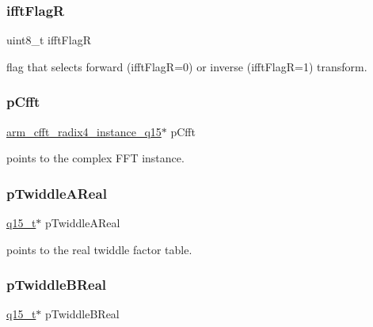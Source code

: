 \subsubsection{\texorpdfstring{ifftFlagR}{ifftFlagR}}
{\footnotesize\ttfamily uint8\+\_\+t ifft\+FlagR}

flag that selects forward (ifft\+FlagR=0) or inverse (ifft\+FlagR=1) transform. \mbox{\label{structarm__rfft__instance__q15_ae0ac7c3a89699793fc0dac960db7f056}} 
\subsubsection{\texorpdfstring{pCfft}{pCfft}}
{\footnotesize\ttfamily \mbox{\hyperlink{structarm__cfft__radix4__instance__q15}{arm\+\_\+cfft\+\_\+radix4\+\_\+instance\+\_\+q15}}$\ast$ p\+Cfft}

points to the complex F\+FT instance. \mbox{\label{structarm__rfft__instance__q15_ac17beaa033ab1ea242d49037276b67e2}} 
\subsubsection{\texorpdfstring{pTwiddleAReal}{pTwiddleAReal}}
{\footnotesize\ttfamily \mbox{\hyperlink{arm__math_8h_ab5a8fb21a5b3b983d5f54f31614052ea}{q15\+\_\+t}}$\ast$ p\+Twiddle\+A\+Real}

points to the real twiddle factor table. \mbox{\label{structarm__rfft__instance__q15_a67a618de57c3a7420ee05fda1a80bf3a}} 
\subsubsection{\texorpdfstring{pTwiddleBReal}{pTwiddleBReal}}
{\footnotesize\ttfamily \mbox{\hyperlink{arm__math_8h_ab5a8fb21a5b3b983d5f54f31614052ea}{q15\+\_\+t}}$\ast$ p\+Twiddle\+B\+Real}

